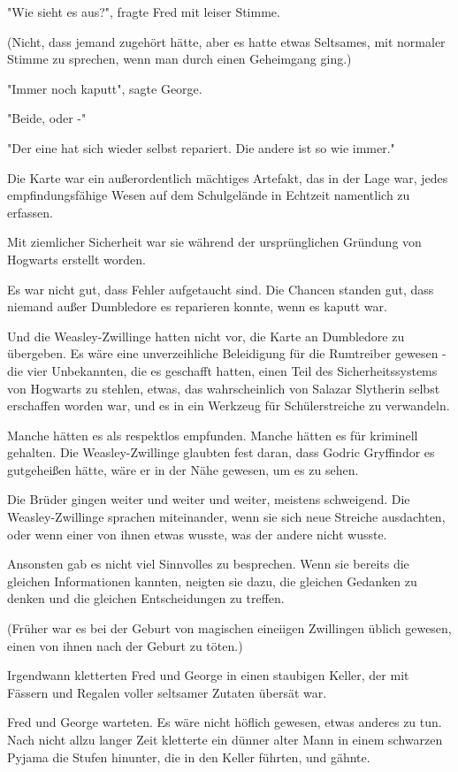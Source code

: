 {"Wie sieht es aus?", fragte Fred mit leiser Stimme.

(Nicht, dass jemand zugehört hätte, aber es hatte etwas Seltsames, mit normaler Stimme zu sprechen, wenn man durch einen Geheimgang ging.)

"Immer noch kaputt", sagte George.

"Beide, oder -"

"Der eine hat sich wieder selbst repariert. Die andere ist so wie immer."

Die Karte war ein außerordentlich mächtiges Artefakt, das in der Lage war, jedes empfindungsfähige Wesen auf dem Schulgelände in Echtzeit namentlich zu erfassen.

Mit ziemlicher Sicherheit war sie während der ursprünglichen Gründung von Hogwarts erstellt worden.

Es war nicht gut, dass Fehler aufgetaucht sind. Die Chancen standen gut, dass niemand außer Dumbledore es reparieren konnte, wenn es kaputt war.

Und die Weasley-Zwillinge hatten nicht vor, die Karte an Dumbledore zu übergeben. Es wäre eine unverzeihliche Beleidigung für die Rumtreiber gewesen - die vier Unbekannten, die es geschafft hatten, einen Teil des Sicherheitssystems von Hogwarts zu stehlen, etwas, das wahrscheinlich von Salazar Slytherin selbst erschaffen worden war, und es in ein Werkzeug für Schülerstreiche zu verwandeln.

Manche hätten es als respektlos empfunden. Manche hätten es für kriminell gehalten. Die Weasley-Zwillinge glaubten fest daran, dass Godric Gryffindor es gutgeheißen hätte, wäre er in der Nähe gewesen, um es zu sehen.

Die Brüder gingen weiter und weiter und weiter, meistens schweigend. Die Weasley-Zwillinge sprachen miteinander, wenn sie sich neue Streiche ausdachten, oder wenn einer von ihnen etwas wusste, was der andere nicht wusste.

Ansonsten gab es nicht viel Sinnvolles zu besprechen. Wenn sie bereits die gleichen Informationen kannten, neigten sie dazu, die gleichen Gedanken zu denken und die gleichen Entscheidungen zu treffen.

(Früher war es bei der Geburt von magischen eineiigen Zwillingen üblich gewesen, einen von ihnen nach der Geburt zu töten.)

Irgendwann kletterten Fred und George in einen staubigen Keller, der mit Fässern und Regalen voller seltsamer Zutaten übersät war.

Fred und George warteten. Es wäre nicht höflich gewesen, etwas anderes zu tun. Nach nicht allzu langer Zeit kletterte ein dünner alter Mann in einem schwarzen Pyjama die Stufen hinunter, die in den Keller führten, und gähnte.

}
